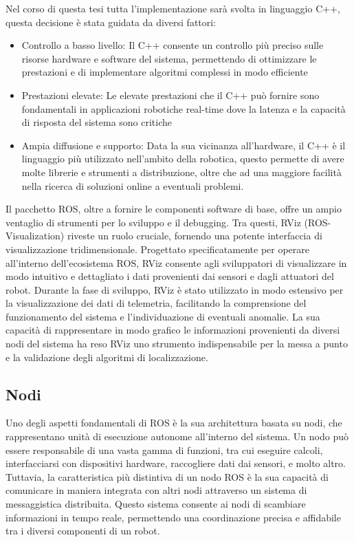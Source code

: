 \noindent Nel corso di questa tesi tutta l'implementazione sarà svolta in linguaggio C++, questa decisione è stata guidata da diversi fattori:

\begin{itemize}
  \item Controllo a basso livello: Il C++ consente un controllo più preciso sulle risorse hardware e software del sistema, permettendo di ottimizzare le prestazioni e di implementare algoritmi complessi in modo efficiente
  \item Prestazioni elevate: Le elevate prestazioni che il C++ può fornire sono fondamentali in applicazioni robotiche real-time dove la latenza e la capacità di risposta del sistema sono critiche
  \item Ampia diffusione e supporto: Data la sua vicinanza all'hardware, il C++ è il linguaggio più utilizzato nell'ambito della robotica, questo permette di avere molte librerie e strumenti a distribuzione, oltre che ad una maggiore facilità nella ricerca di soluzioni online a eventuali problemi.
\end{itemize}

\noindent Il pacchetto ROS, oltre a fornire le componenti software di base, offre un ampio ventaglio di strumenti per lo sviluppo e il debugging. Tra questi, RViz (ROS-Visualization) riveste un ruolo cruciale, fornendo una potente interfaccia di visualizzazione tridimensionale. Progettato specificatamente per operare all'interno dell'ecosistema ROS, RViz consente agli sviluppatori di visualizzare in modo intuitivo e dettagliato i dati provenienti dai sensori e dagli attuatori del robot. Durante la fase di sviluppo, RViz è stato utilizzato in modo estensivo per la visualizzazione dei dati di telemetria, facilitando la comprensione del funzionamento del sistema e l'individuazione di eventuali anomalie. La sua capacità di rappresentare in modo grafico le informazioni provenienti da diversi nodi del sistema ha reso RViz uno strumento indispensabile per la messa a punto e la validazione degli algoritmi di localizzazione.

\subsection{Nodi}
\noindent Uno degli aspetti fondamentali di ROS è la sua architettura basata su nodi, che rappresentano unità di esecuzione autonome all'interno del sistema. Un nodo può essere responsabile di una vasta gamma di funzioni, tra cui eseguire calcoli, interfacciarsi con dispositivi hardware, raccogliere dati dai sensori, e molto altro. Tuttavia, la caratteristica più distintiva di un nodo ROS è la sua capacità di comunicare in maniera integrata con altri nodi attraverso un sistema di messaggistica distribuita. Questo sistema consente ai nodi di scambiare informazioni in tempo reale, permettendo una coordinazione precisa e affidabile tra i diversi componenti di un robot.

